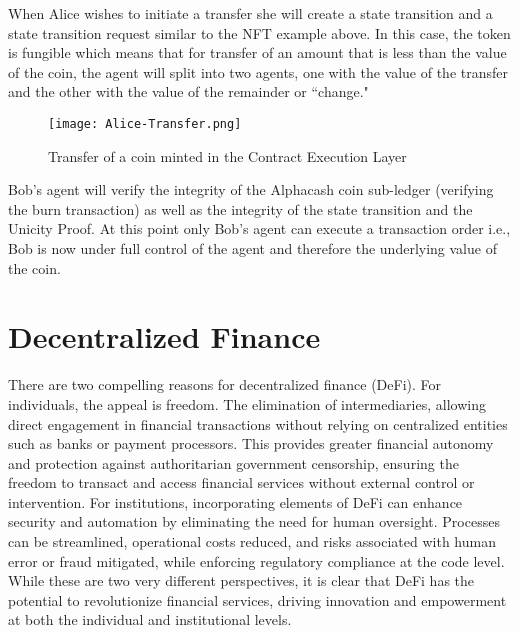 \documentclass{article}
\begin{document}
When Alice wishes to initiate a transfer she will create a state transition and a state transition request similar to the NFT example above. In this case, the token is fungible which means that for transfer of an amount that is less than the value of the coin, the agent will split into two agents, one with the value of the transfer and the other with the value of the remainder or ``change."

\begin{figure}[H]
    \centering
    \texttt{[image: Alice-Transfer.png]}
    \caption{Transfer of a coin minted in the Contract Execution Layer}
    \label{fig:Alice Transfer}
\end{figure}


\vspace{2mm}

Bob's agent will verify the integrity of the Alphacash coin sub-ledger (verifying the burn transaction) as well as the integrity of the state transition and the Unicity Proof. At this point only Bob's agent can execute a transaction order i.e., Bob is now under full control of the agent and therefore the underlying value of the coin.

\vspace{2mm}


\section{Decentralized Finance}
There are two compelling reasons for decentralized finance (DeFi). For individuals, the appeal is freedom. The elimination of intermediaries, allowing direct engagement in financial transactions without relying on centralized entities such as banks or payment processors. This provides greater financial autonomy and protection against authoritarian government censorship, ensuring the freedom to transact and access financial services without external control or intervention. For institutions, incorporating elements of DeFi can enhance security and automation by eliminating the need for human oversight. Processes can be streamlined, operational costs reduced, and risks associated with human error or fraud mitigated, while enforcing regulatory compliance at the code level. While these are two very different perspectives, it is clear that DeFi has the potential to revolutionize financial services, driving innovation and empowerment at both the individual and institutional levels.
\end{document}
